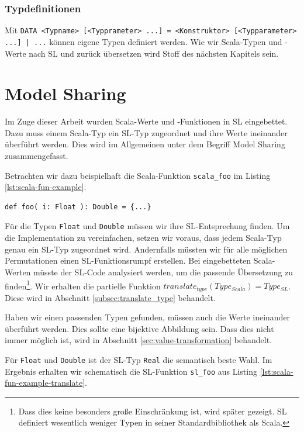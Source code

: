 \documentclass[12pt,bibtotoc]{scrreprt}
\begin{document}
\subsection{Typdefinitionen}

Mit \lstinline!DATA <Typname> [<Typprameter> ...] = <Konstruktor> [<Typparameter> ...] | ...! können eigene Typen definiert werden. Wie wir Scala-Typen und -Werte nach SL und zurück übersetzen wird Stoff des nächsten Kapitels sein.

\chapter{Model Sharing}
\label{cha:model-sharing}

Im Zuge dieser Arbeit wurden Scala-Werte und -Funktionen in SL eingebettet. Dazu muss einem Scala-Typ ein SL-Typ zugeordnet und ihre Werte ineinander überführt werden. Dies wird im Allgemeinen unter dem Begriff Model Sharing zusammengefasst.

Betrachten wir dazu beispielhaft die Scala-Funktion \lstinline!scala_foo! im Listing \ref{lst:scala-fun-example}.

\begin{lstlisting}[caption=Beispielfunktion scala\_foo, label=lst:scala-fun-example]
def foo( i: Float ): Double = {...}
\end{lstlisting}

Für die Typen \lstinline!Float! und \lstinline!Double! müssen wir ihre SL-Entsprechung finden. Um die Implementation zu vereinfachen, setzen wir voraus, dass jedem Scala-Typ genau ein SL-Typ zugeordnet wird. Andernfalls müssten wir für alle möglichen Permutationen einen SL-Funktionsrumpf erstellen. Bei eingebetteten Scala-Werten müsste der SL-Code analysiert werden, um die passende Übersetzung zu finden\footnote{Dass dies keine besonders große Einschränkung ist, wird später gezeigt. SL definiert wesentlich weniger Typen in seiner Standardbibliothek als Scala. }. Wir erhalten die partielle Funktion $translate_{type}(Type_{Scala}) = Type_{SL}$. Diese wird in Abschnitt \ref{subsec:translate_type} behandelt.

Haben wir einen passenden Typen gefunden, müssen auch die Werte ineinander überführt werden. Dies sollte eine bijektive Abbildung sein. Dass dies nicht immer möglich ist, wird in Abschnitt \ref{sec:value-transformation} behandelt.

Für \lstinline!Float! und \lstinline!Double! ist der SL-Typ \lstinline!Real! die semantisch beste Wahl. Im Ergebnis erhalten wir schematisch die SL-Funktion \lstinline!sl_foo! aus Listing \ref{lst:scala-fun-example-translate}.
\end{document}
